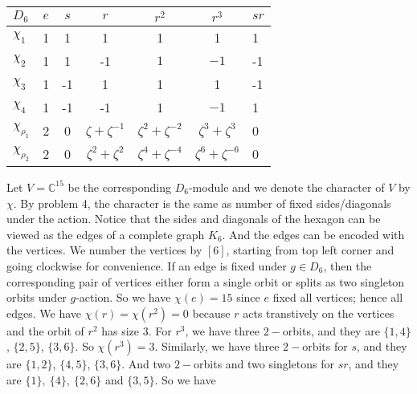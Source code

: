 \documentclass[12pt]{amsart}
\newcommand{\C}{\mathbb{C}}
\begin{document}
\begin{table}[H]
    \centering
    \begin{tabular}{l|cccccl}
        $D_6$                         & $e$ & $s$ & $r$                                            & $r^2$                      &  $r^3$                                                        & $sr$ \\ \hline
        $\chi_1$                      & 1   & 1   & 1                                              & 1                          & 1                                                                      & 1    \\
        $\chi_2$                      & 1   & 1   & -1                                             & $1$                         & $-1$                                                     & -1   \\
        $\chi_3$                      & 1   & -1  & 1                                              & 1                          & 1                                                                      & -1   \\
        $\chi_4$                      & 1   & -1  & -1                                             & 1                          & $-1$                                                     & 1    \\
        $\chi_{\rho_1} $              & 2   & 0   & $\zeta+\zeta^{-1} $                            & $\zeta^{2}+\zeta^{-2}$     & $\zeta^3+\zeta^3$                                 & 0    \\
        $\chi_{\rho_{2}}$ & 2   & 0   & $\zeta^2+\zeta^2$ & $\zeta^{4}+\zeta^{-4}$  & $\zeta^6+\zeta^{-6}$ & 0
    \end{tabular}
\end{table}
\noindent Let $V=\C^{15}$ be the corresponding $D_6$-module and we denote the character of $V$ by $\chi$. By problem 4, the character is the same as number of fixed sides/diagonals under the action. Notice that the sides and diagonals of the hexagon can be viewed as the edges of a complete graph $K_6$. And the edges can be encoded with the vertices. We number the vertices by $[6]$, starting from top left corner and going clockwise for convenience. If an edge is fixed under $g\in D_6$, then the corresponding pair of vertices either form a single orbit or splits as two singleton orbits under $g$-action. So we have $\chi(e)=15$ since $e$ fixed all vertices; hence all edges. We have $\chi(r)=\chi(r^2)=0$ because $r$ acts transtively on the vertices and the orbit of $r^2$ has size 3. For $r^3$, we have three $2-$orbits, and they are $\{1,4\}$, $\{2,5\}$, $\{3,6\}$. So $\chi(r^3)=3$. Similarly, we have three $2-$orbits for $s$, and they are $\{1,2\}$, $\{4,5\}$, $\{3,6\}$. And two $2-$orbits and two singletons for $sr$, and they are $\{1\},\ \{4\},\ \{2,6\}$ and $\{3,5\}$. So we have 
\end{document}
